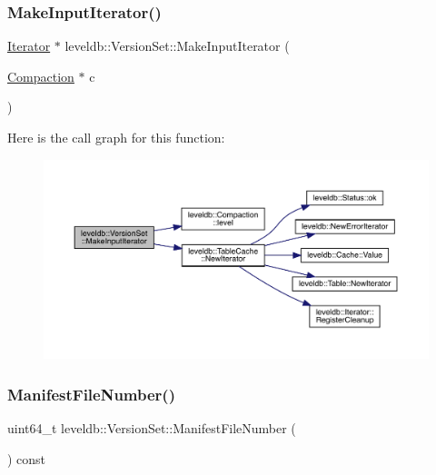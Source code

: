 \mbox{\label{classleveldb_1_1_version_set_a181194e96a88e69a60c1fda9cf3c4651}} 
\subsubsection{\texorpdfstring{MakeInputIterator()}{MakeInputIterator()}}
{\footnotesize\ttfamily \mbox{\hyperlink{classleveldb_1_1_iterator}{Iterator}} $\ast$ leveldb\+::\+Version\+Set\+::\+Make\+Input\+Iterator (\begin{DoxyParamCaption}\item[{\mbox{\hyperlink{classleveldb_1_1_compaction}{Compaction}} $\ast$}]{c }\end{DoxyParamCaption})}

Here is the call graph for this function\+:
\nopagebreak
\begin{figure}[H]
\begin{center}
\leavevmode
\includegraphics[width=350pt]{classleveldb_1_1_version_set_a181194e96a88e69a60c1fda9cf3c4651_cgraph}
\end{center}
\end{figure}
\mbox{\label{classleveldb_1_1_version_set_a208a57b4b28938ca0d8c8099d3c1f163}} 
\subsubsection{\texorpdfstring{ManifestFileNumber()}{ManifestFileNumber()}}
{\footnotesize\ttfamily uint64\+\_\+t leveldb\+::\+Version\+Set\+::\+Manifest\+File\+Number (\begin{DoxyParamCaption}{ }\end{DoxyParamCaption}) const\hspace{0.3cm}{\ttfamily [inline]}}


